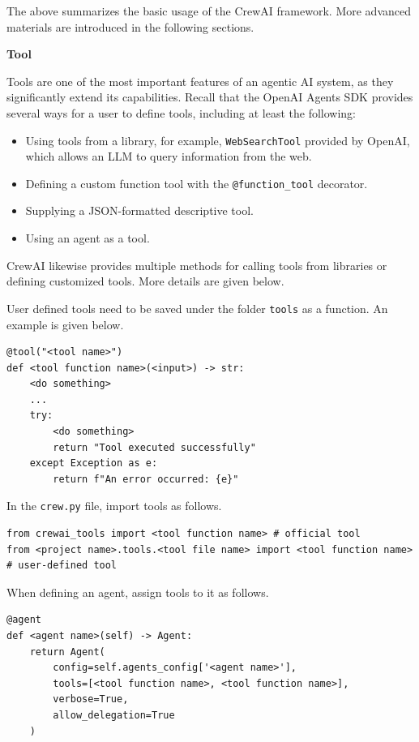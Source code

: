 The above summarizes the basic usage of the CrewAI framework. More advanced materials are introduced in the following sections.

\vspace{0.1in}
\noindent \textbf{Tool}
\vspace{0.1in}

Tools are one of the most important features of an agentic AI system, as they significantly extend its capabilities. Recall that the OpenAI Agents SDK provides several ways for a user to define tools, including at least the following:
\begin{itemize}
	\item Using tools from a library, for example, \verb|WebSearchTool| provided by OpenAI, which allows an LLM to query information from the web.
	\item Defining a custom function tool with the \verb|@function_tool| decorator.
	\item Supplying a JSON-formatted descriptive tool.
	\item Using an agent as a tool.
\end{itemize}

CrewAI likewise provides multiple methods for calling tools from libraries or defining customized tools. More details are given below.

User defined tools need to be saved under the folder \texttt{tools} as a function. An example is given below.
\begin{lstlisting}
@tool("<tool name>")
def <tool function name>(<input>) -> str:
    <do something>
    ...
    try:
        <do something>
        return "Tool executed successfully"
    except Exception as e:
        return f"An error occurred: {e}"
\end{lstlisting}

In the \verb|crew.py| file, import tools as follows.
\begin{lstlisting}
from crewai_tools import <tool function name> # official tool 
from <project name>.tools.<tool file name> import <tool function name> # user-defined tool
\end{lstlisting}
When defining an agent, assign tools to it as follows.
\begin{lstlisting}
@agent
def <agent name>(self) -> Agent:
    return Agent(
        config=self.agents_config['<agent name>'],
        tools=[<tool function name>, <tool function name>],
        verbose=True,
        allow_delegation=True
    )
\end{lstlisting}


